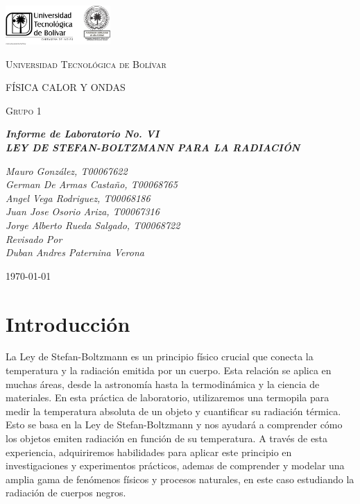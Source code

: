 \documentclass[letterpaper, 12pt]{article}
\begin{document}
\begin{titlepage}
      \centering
      \includegraphics[width=0.3\textwidth]{Images/logo_utb.png}\par\vspace{1cm}
      {\scshape\LARGE Universidad Tecnológica de Bolívar \par}
      \vspace{1cm}

      {\scshape\Large FÍSICA CALOR Y ONDAS \par}
      \vspace{.2cm}

      {\scshape\Large Grupo 1 \par}
      \vspace{1cm}
      \slshape {\Large \bfseries{}Informe de Laboratorio No. VI\\}
      \slshape {\small \bfseries{}LEY DE STEFAN-BOLTZMANN PARA LA RADIACIÓN}
      \vspace{2cm}

      \slshape {\itshape{} Mauro González, T00067622 \\}
      \slshape {\itshape{} German De Armas Castaño, T00068765 \\}
      \slshape {\itshape{} Angel Vega Rodriguez, T00068186 \\}
      \slshape {\itshape{} Juan Jose Osorio Ariza, T00067316 \\}
      \slshape {\itshape{} Jorge Alberto Rueda Salgado, T00068722 \\}
      \vfill
      Revisado Por \\
      Duban Andres Paternina Verona\\
      {\large \today\par}
\end{titlepage}


\section{Introducción}

La Ley de Stefan-Boltzmann es un principio físico crucial
que conecta la temperatura y la radiación emitida por un
cuerpo. Esta relación se aplica en muchas áreas, desde la
astronomía hasta la termodinámica y la ciencia de
materiales. En esta práctica de laboratorio, utilizaremos
una termopila para medir la temperatura absoluta de un
objeto y cuantificar su radiación térmica. Esto se basa en
la Ley de Stefan-Boltzmann y nos ayudará a comprender cómo
los objetos emiten radiación en función de su temperatura.
A través de esta experiencia, adquiriremos habilidades para
aplicar este principio en investigaciones y experimentos
prácticos, ademas de comprender y modelar una amplia gama
de fenómenos físicos y procesos naturales, en este caso
estudiando la radiación de cuerpos negros.
\end{document}
